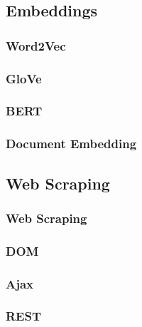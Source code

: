 \subsection{Embeddings}
\subsubsection{Word2Vec}
\subsubsection{GloVe}
\subsubsection{BERT}
\subsubsection{Document Embedding}

\subsection{Web Scraping}
\subsubsection{Web Scraping}
\subsubsection{DOM}
\subsubsection{Ajax}
\subsubsection{REST}
